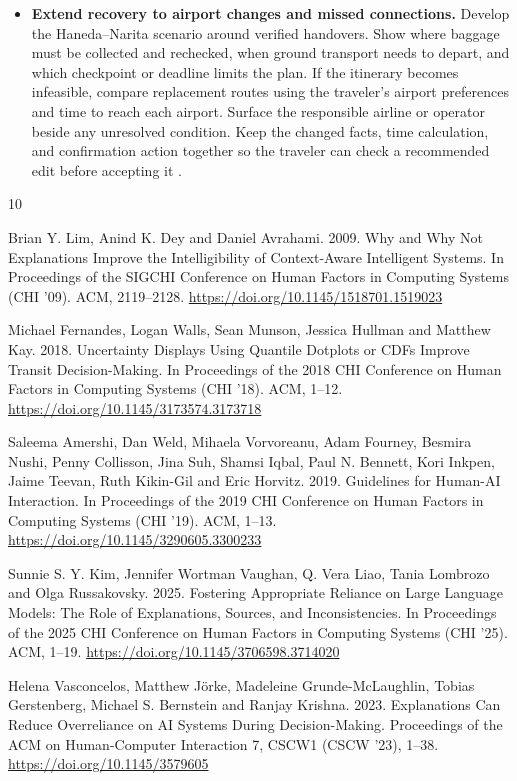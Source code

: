 \documentclass[sigconf,nonacm,balance=false]{acmart}
\begin{document}
\begin{itemize}
\item \textbf{Extend recovery to airport changes and missed connections.} Develop the Haneda--Narita scenario around verified handovers. Show where baggage must be collected and rechecked, when ground transport needs to depart, and which checkpoint or deadline limits the plan. If the itinerary becomes infeasible, compare replacement routes using the traveler's airport preferences and time to reach each airport. Surface the responsible airline or operator beside any unresolved condition. Keep the changed facts, time calculation, and confirmation action together so the traveler can check a recommended edit before accepting it \cite{ref144,ref220}.
\end{itemize}

\clearpage

\begin{thebibliography}{10}

Brian Y. Lim, Anind K. Dey and Daniel Avrahami. 2009. Why and Why Not Explanations Improve the Intelligibility of Context-Aware Intelligent Systems. In Proceedings of the SIGCHI Conference on Human Factors in Computing Systems (CHI '09). ACM, 2119--2128. \url{https://doi.org/10.1145/1518701.1519023}

Michael Fernandes, Logan Walls, Sean Munson, Jessica Hullman and Matthew Kay. 2018. Uncertainty Displays Using Quantile Dotplots or CDFs Improve Transit Decision-Making. In Proceedings of the 2018 CHI Conference on Human Factors in Computing Systems (CHI '18). ACM, 1--12. \url{https://doi.org/10.1145/3173574.3173718}

Saleema Amershi, Dan Weld, Mihaela Vorvoreanu, Adam Fourney, Besmira Nushi, Penny Collisson, Jina Suh, Shamsi Iqbal, Paul N. Bennett, Kori Inkpen, Jaime Teevan, Ruth Kikin-Gil and Eric Horvitz. 2019. Guidelines for Human-AI Interaction. In Proceedings of the 2019 CHI Conference on Human Factors in Computing Systems (CHI '19). ACM, 1--13. \url{https://doi.org/10.1145/3290605.3300233}

Sunnie S. Y. Kim, Jennifer Wortman Vaughan, Q. Vera Liao, Tania Lombrozo and Olga Russakovsky. 2025. Fostering Appropriate Reliance on Large Language Models: The Role of Explanations, Sources, and Inconsistencies. In Proceedings of the 2025 CHI Conference on Human Factors in Computing Systems (CHI '25). ACM, 1--19. \url{https://doi.org/10.1145/3706598.3714020}

Helena Vasconcelos, Matthew J\"{o}rke, Madeleine Grunde-McLaughlin, Tobias Gerstenberg, Michael S. Bernstein and Ranjay Krishna. 2023. Explanations Can Reduce Overreliance on AI Systems During Decision-Making. Proceedings of the ACM on Human-Computer Interaction 7, CSCW1 (CSCW '23), 1--38. \url{https://doi.org/10.1145/3579605}


\end{thebibliography}
\end{document}
